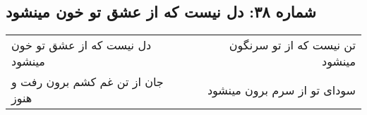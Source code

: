 \begin{center}
\section*{شماره ۳۸: دل نیست که از عشق تو خون مینشود}
\label{sec:038}
\begin{longtable}{l p{0.5cm} r}
دل نیست که از عشق تو خون مینشود
&&
تن نیست که از تو سرنگون مینشود
\\
جان از تن غم کشم برون رفت و هنوز
&&
سودای تو از سرم برون مینشود
\\
\end{longtable}
\end{center}
